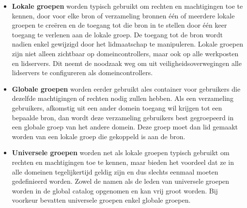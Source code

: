 \begin{enumerate}
{		}
		{ 
			\begin{itemize}
				\item \textbf{Lokale groepen} worden typisch gebruikt om rechten en machtigingen toe te kennen, door voor elke bron of verzameling bronnen één of meerdere lokale groepen te creëren en de toegang tot die bron in te stellen door één keer toegang te verlenen aan de lokale groep. De toegang tot de bron wordt nadien enkel gewijzigd door het lidmaatschap te manipuleren. Lokale groepen zijn niet alleen zichtbaar op domeincontrollers, maar ook op alle werkposten en lidservers. Dit neemt de noodzaak weg om uit veiligheidsoverwegingen alle lidservers te configureren als domeincontrollers.

				\item \textbf{Globale groepen} worden eerder gebruikt ales container voor gebruikers die dezelfde machtigingen of rechten nodig zullen hebben. Als een verzameling gebruikers, afkomstig uit een ander domein toegang wil krijgen tot een bepaalde bron, dan wordt deze verzameling gebruikers best gegroepeerd in een globale groep van het andere domein. Deze groep moet dan lid gemaakt worden van een lokale groep die gekoppeld is aan de bron.

				\item \textbf{Universele groepen} worden net als lokale groepen typisch gebruikt om rechten en machtigingen toe te kennen, maar bieden het voordeel dat ze in alle domeinen tegelijkertijd geldig zijn en dus slechts eenmaal moeten gedefinieerd worden. Zowel de namen als de leden van universele groepen worden in de global catalog opgenomen en kan vrij groot worden. Bij voorkeur bevatten universele groepen enkel globale groepen.
			\end{itemize}
		}
		

\end{enumerate}
